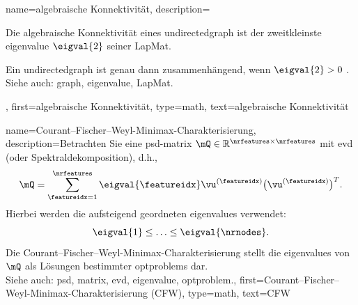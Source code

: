 {{{{
{name={algebraische Konnektivität},
 description={Die algebraische Konnektivität eines \gls{undirectedgraph} ist der zweitkleinste \gls{eigenvalue} $\eigval{2}$ seiner \gls{LapMat}. 
 	\begin{figure}[H]
 		\centering
 	\end{figure}
 	Ein \gls{undirectedgraph} ist genau dann zusammenhängend, wenn $\eigval{2} > 0$ \cite{ChungSpecGraphTheory,Spielman2019}. 
 	\\
 	Siehe auch: \gls{graph}, \gls{eigenvalue}, \gls{LapMat}.},
 first={algebraische Konnektivität},
 type=math,
 text={algebraische Konnektivität}
}

{name={Courant–Fischer–Weyl-Minimax-Charakterisierung}, 
 description={Betrachten Sie eine \gls{psd}-\gls{matrix} 
 	$\mQ \in \mathbb{R}^{\nrfeatures \times \nrfeatures}$ mit \gls{evd} (oder Spektraldekomposition), d.h.,
 	$$\mQ = \sum_{\featureidx=1}^{\nrfeatures} \eigval{\featureidx} \vu^{(\featureidx)} \big(  \vu^{(\featureidx)}  \big)^{T}.$$ 
 	Hierbei werden die aufsteigend geordneten \glspl{eigenvalue} verwendet:
 	\begin{equation}
 		\nonumber
 		\eigval{1} \le \ldots \le \eigval{\nrnodes}.
 	\end{equation}
 	Die Courant–Fischer–Weyl-Minimax-Charakterisierung \cite[Th. 8.1.2]{GolubVanLoanBook} stellt die \glspl{eigenvalue} von $\mQ$ als Lösungen bestimmter \glspl{optproblem} dar.
 	\\
 	Siehe auch: \gls{psd}, \gls{matrix}, \gls{evd}, \gls{eigenvalue}, \gls{optproblem}.}, 
 first={Courant–Fischer–Weyl-Minimax-Charakterisierung (CFW)}, 
 type=math,
 text={CFW}
}

}}}}

